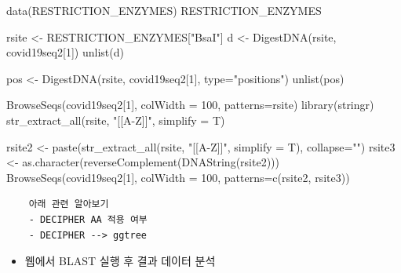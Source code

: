 \documentclass[
]{book}
\newenvironment{Shaded}{\begin{snugshade}}{\end{snugshade}}
\newcommand{\AttributeTok}[1]{\textcolor[rgb]{0.77,0.63,0.00}{#1}}
\newcommand{\DecValTok}[1]{\textcolor[rgb]{0.00,0.00,0.81}{#1}}
\newcommand{\FunctionTok}[1]{\textcolor[rgb]{0.00,0.00,0.00}{#1}}
\newcommand{\NormalTok}[1]{#1}
\newcommand{\OtherTok}[1]{\textcolor[rgb]{0.56,0.35,0.01}{#1}}
\newcommand{\StringTok}[1]{\textcolor[rgb]{0.31,0.60,0.02}{#1}}
\providecommand{\tightlist}{%
  \setlength{\itemsep}{0pt}\setlength{\parskip}{0pt}}
\begin{document}
\begin{Shaded}
\begin{Highlighting}[]
\FunctionTok{data}\NormalTok{(RESTRICTION\_ENZYMES)}
\NormalTok{RESTRICTION\_ENZYMES}

\NormalTok{rsite }\OtherTok{\textless{}{-}}\NormalTok{ RESTRICTION\_ENZYMES[}\StringTok{"BsaI"}\NormalTok{]}
\NormalTok{d }\OtherTok{\textless{}{-}} \FunctionTok{DigestDNA}\NormalTok{(rsite, covid19seq2[}\DecValTok{1}\NormalTok{])}
\FunctionTok{unlist}\NormalTok{(d)}

\NormalTok{pos }\OtherTok{\textless{}{-}} \FunctionTok{DigestDNA}\NormalTok{(rsite, covid19seq2[}\DecValTok{1}\NormalTok{], }\AttributeTok{type=}\StringTok{"positions"}\NormalTok{)}
\FunctionTok{unlist}\NormalTok{(pos)}

\FunctionTok{BrowseSeqs}\NormalTok{(covid19seq2[}\DecValTok{1}\NormalTok{], }\AttributeTok{colWidth =} \DecValTok{100}\NormalTok{, }\AttributeTok{patterns=}\NormalTok{rsite)}
\FunctionTok{library}\NormalTok{(stringr)}
\FunctionTok{str\_extract\_all}\NormalTok{(rsite, }\StringTok{"[[A{-}Z]]"}\NormalTok{, }\AttributeTok{simplify =}\NormalTok{ T)}


\NormalTok{rsite2 }\OtherTok{\textless{}{-}} \FunctionTok{paste}\NormalTok{(}\FunctionTok{str\_extract\_all}\NormalTok{(rsite, }\StringTok{"[[A{-}Z]]"}\NormalTok{, }\AttributeTok{simplify =}\NormalTok{ T), }\AttributeTok{collapse=}\StringTok{""}\NormalTok{)}
\NormalTok{rsite3 }\OtherTok{\textless{}{-}} \FunctionTok{as.character}\NormalTok{(}\FunctionTok{reverseComplement}\NormalTok{(}\FunctionTok{DNAString}\NormalTok{(rsite2)))}
\FunctionTok{BrowseSeqs}\NormalTok{(covid19seq2[}\DecValTok{1}\NormalTok{], }\AttributeTok{colWidth =} \DecValTok{100}\NormalTok{, }\AttributeTok{patterns=}\FunctionTok{c}\NormalTok{(rsite2, rsite3))}
\end{Highlighting}
\end{Shaded}

\begin{verbatim}
    아래 관련 알아보기 
    - DECIPHER AA 적용 여부
    - DECIPHER --> ggtree
\end{verbatim}

\begin{itemize}
\tightlist
\item
  웹에서 BLAST 실행 후 결과 데이터 분석
\end{itemize}
\end{document}
